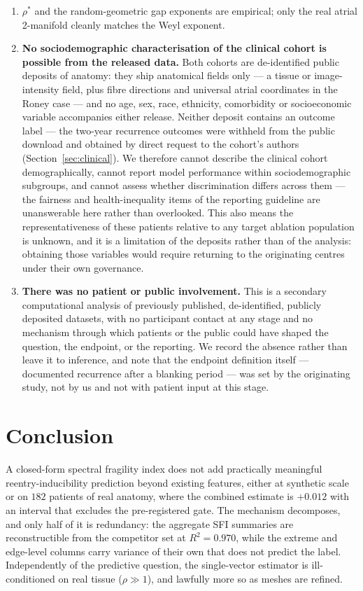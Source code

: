 \documentclass[11pt]{article}
\theoremstyle{definition}
\newcommand{\rhoval}{\rho}
\begin{document}
\begin{enumerate}[leftmargin=1.5em]
\item $\rhoval^\ast$ and the random-geometric gap exponents are empirical; only
the real atrial 2-manifold cleanly matches the Weyl exponent.
\item \textbf{No sociodemographic characterisation of the clinical cohort is
possible from the released data.} Both cohorts are de-identified public deposits
of anatomy: they ship anatomical fields only --- a tissue or image-intensity
field, plus fibre directions and universal atrial coordinates in the Roney case
--- and no age, sex, race, ethnicity, comorbidity or socioeconomic variable
accompanies either release. Neither deposit contains an outcome label --- the two-year
recurrence outcomes were withheld from the public download and obtained by
direct request to the cohort's authors (Section~\ref{sec:clinical}). We
therefore cannot describe the clinical cohort demographically, cannot report
model performance within sociodemographic subgroups, and cannot assess whether
discrimination differs across them --- the fairness and health-inequality items
of the reporting guideline are unanswerable here rather than overlooked. This
also means the representativeness of these patients relative to any target
ablation population is unknown, and it is a limitation of the deposits rather
than of the analysis: obtaining those variables would require returning to the
originating centres under their own governance.
\item \textbf{There was no patient or public involvement.} This is a secondary
computational analysis of previously published, de-identified, publicly
deposited datasets, with no participant contact at any stage and no mechanism
through which patients or the public could have shaped the question, the
endpoint, or the reporting. We record the absence rather than leave it to
inference, and note that the endpoint definition itself --- documented
recurrence after a blanking period --- was set by the originating study, not by
us and not with patient input at this stage.
\end{enumerate}


\section{Conclusion}
A closed-form spectral fragility index does not add practically meaningful
reentry-inducibility prediction beyond existing features, either at synthetic
scale or on $182$ patients of real anatomy, where the combined estimate is
$+0.012$ with an interval that excludes the pre-registered gate. The mechanism
decomposes, and only half of it is redundancy: the aggregate SFI summaries are
reconstructible from the competitor set at $R^2=0.970$, while the extreme and
edge-level columns carry variance of their own that does not predict the label.
Independently of the predictive question, the single-vector estimator is
ill-conditioned on real tissue ($\rhoval\gg1$), and lawfully more so as meshes
are refined.
\end{document}
